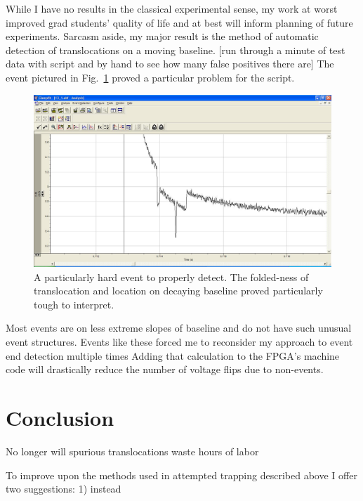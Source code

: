 \documentclass[aps,prl,preprint,groupedaddress]{revtex4}
\begin{document}
While I have no results in the classical experimental sense, my work at worst improved grad students' quality of life and at best will inform planning of future experiments.
Sarcasm aside, my major result is the method of automatic detection of translocations on a moving baseline.
[run through a minute of test data with script and by hand to see how many false positives there are]
The event pictured in Fig.~\ref{fig:tough-event} proved a particular problem for the script.
\begin{figure}
\centering
\includegraphics[width=1\textwidth]{figures/tough-event}
\caption{A particularly hard event to properly detect.
The folded-ness of translocation and location on decaying baseline proved particularly tough to interpret.}
\label{fig:tough-event}
\end{figure}
Most events are on less extreme slopes of baseline and do not have such unusual event structures.
Events like these forced me to reconsider my approach to event end detection multiple times
Adding that calculation to the FPGA's machine code will drastically reduce the number of voltage flips due to non-events.

\section{Conclusion}

No longer will spurious translocations waste hours of labor

To improve upon the methods used in attempted trapping described above I offer two suggestions:
1) instead

\end{document}
